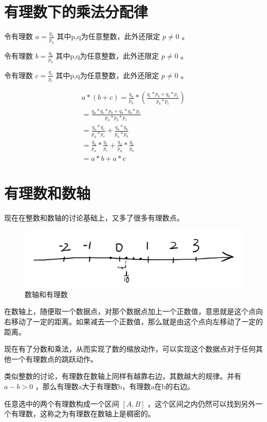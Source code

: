 \documentclass[12pt,oneside]{book}
\begin{document}
\section{有理数下的乘法分配律}
令有理数 $a = \frac{q_a}{p_a}$ 其中p,q为任意整数，此外还限定 $p \neq 0$ 。

令有理数 $b = \frac{q_b}{p_b}$ 其中p,q为任意整数，此外还限定 $p \neq 0$ 。

令有理数 $c = \frac{q_c}{p_c}$ 其中p,q为任意整数，此外还限定 $p \neq 0$ 。


\begin{align*}
a * (b + c) = \frac{q_a}{p_a} * ( \frac{q_c * p_b + q_b * p_c}{p_b * p_c})\\
= \frac{q_a*q_c*p_b + q_a*q_b*p_c}{p_a*p_b*p_c}\\
= \frac{q_a*q_c}{p_a*p_c} + \frac{q_a*q_b}{p_a*p_b}\\
=\frac{q_a}{p_a} * \frac{q_c}{p_c} + \frac{q_a}{p_a} * \frac{q_b}{p_b}\\
= a*b + a*c
\end{align*}


\section{有理数和数轴}
现在在整数和数轴的讨论基础上，又多了很多有理数点。

\begin{figure}[H]
\centering
\includegraphics[width=\linewidth ,totalheight=0.95\textheight , keepaspectratio]{数轴和有理数系.png}
\caption{数轴和有理数}
\end{figure}

在数轴上，随便取一个数据点，对那个数据点加上一个正数值，意思就是这个点向右移动了一定的距离。如果减去一个正数值，那么就是由这个点向左移动了一定的距离。

现在有了分数和乘法，从而实现了数的缩放动作，可以实现这个数据点对于任何其他一个有理数点的跳跃动作。

类似整数的讨论，有理数在数轴上同样有越靠右边，其数越大的规律。并有 $a-b>0$ ，那么有理数a大于有理数b，有理数a在b的右边。

任意选中的两个有理数构成一个区间 $[A, B]$ ，这个区间之内仍然可以找到另外一个有理数，这称之为有理数在数轴上是稠密的。
\end{document}
